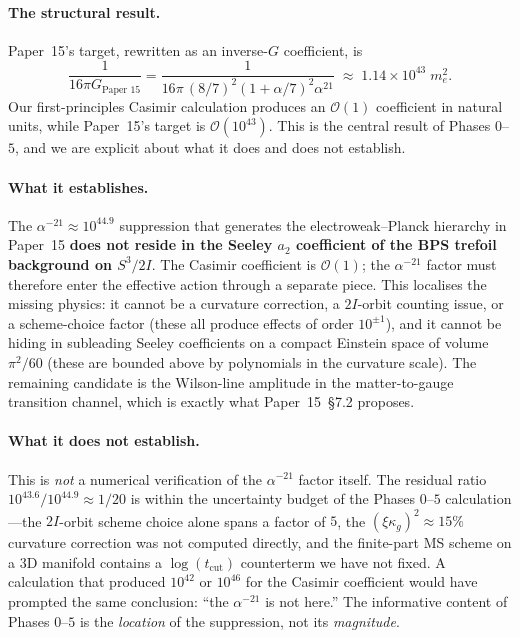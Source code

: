 \documentclass[11pt]{article}
\begin{document}
\paragraph{The structural result.}
Paper~15's target, rewritten as an inverse-$G$ coefficient, is
\begin{equation}
  \frac{1}{16 \pi G_\text{Paper 15}}
   =  \frac{1}{16 \pi \, (8/7)^2 (1 {+} \alpha/7)^2 \alpha^{21}}
   \;\approx\; 1.14 \times 10^{43} \; m_e^2 .
\end{equation}
Our first-principles Casimir calculation produces an
$\mathcal{O}(1)$ coefficient in natural units, while Paper~15's
target is $\mathcal{O}(10^{43})$.  This is the central result of
Phases $0$--$5$, and we are explicit about what it does and does
not establish.

\paragraph{What it establishes.}
The $\alpha^{-21} \approx 10^{44.9}$ suppression that generates the
electroweak--Planck hierarchy in Paper~15 \textbf{does not reside
in the Seeley $a_2$ coefficient of the BPS trefoil background on
$S^3/2I$}.  The Casimir coefficient is $\mathcal{O}(1)$; the
$\alpha^{-21}$ factor must therefore enter the effective action
through a separate piece.  This localises the missing physics:
it cannot be a curvature correction, a $2I$-orbit counting issue,
or a scheme-choice factor (these all produce effects of order
$10^{\pm 1}$), and it cannot be hiding in subleading Seeley
coefficients on a compact Einstein space of volume $\pi^2/60$
(these are bounded above by polynomials in the curvature scale).
The remaining candidate is the Wilson-line amplitude in the
matter-to-gauge transition channel, which is exactly what
Paper~15~\S7.2 proposes.

\paragraph{What it does not establish.}
This is \emph{not} a numerical verification of the $\alpha^{-21}$
factor itself.  The residual ratio $10^{43.6} / 10^{44.9} \approx
1/20$ is within the uncertainty budget of the Phases $0$--$5$
calculation---the $2I$-orbit scheme choice alone spans a factor of
$5$, the $(\xi \kappa_g)^2 \approx 15\%$ curvature correction was
not computed directly, and the finite-part MS scheme on a 3D
manifold contains a $\log(t_\text{cut})$ counterterm we have not
fixed.  A calculation that produced $10^{42}$ or $10^{46}$ for the
Casimir coefficient would have prompted the same conclusion:
``the $\alpha^{-21}$ is not here.''  The informative content of
Phases $0$--$5$ is the \emph{location} of the suppression, not its
\emph{magnitude}.
\end{document}
